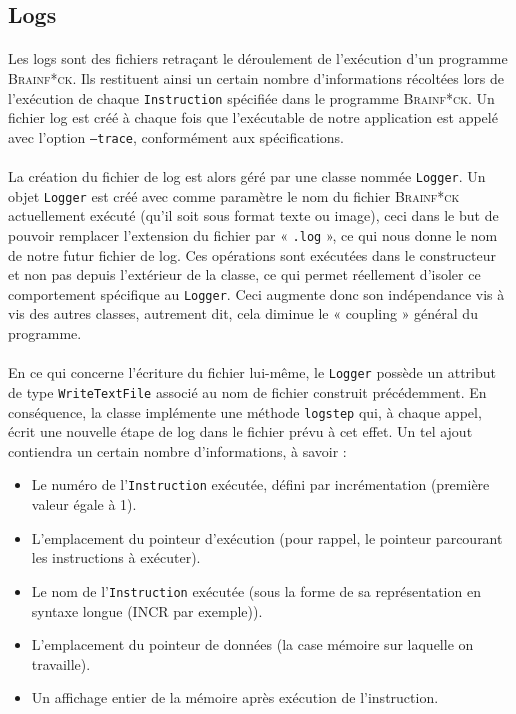 \documentclass[a4paper]{article}
\begin{document}
\subsection{Logs}
\paragraph{}Les logs sont des fichiers retraçant le déroulement de l'exécution d'un programme \textsc{Brainf*ck}. Ils restituent ainsi un certain nombre d'informations récoltées lors de l'exécution de chaque \texttt{Instruction} spécifiée dans le programme \textsc{Brainf*ck}. Un fichier log est créé à chaque fois que l'exécutable de notre application est appelé avec l'option \texttt{--trace}, conformément aux spécifications.

\paragraph{}La création du fichier de log est alors géré par une classe nommée \texttt{Logger}. Un objet \texttt{Logger} est créé avec comme paramètre le nom du fichier \textsc{Brainf*ck} actuellement exécuté (qu'il soit sous format texte ou image), ceci dans le but de pouvoir remplacer l'extension du fichier par « \texttt{.log} », ce qui nous donne le nom de notre futur fichier de log. Ces opérations sont exécutées dans le constructeur et non pas depuis l'extérieur de la classe, ce qui permet réellement d'isoler ce comportement spécifique au \texttt{Logger}. Ceci augmente donc son indépendance vis à vis des autres classes, autrement dit, cela diminue le « coupling » général du programme.

\paragraph{}En ce qui concerne l'écriture du fichier lui-même, le \texttt{Logger} possède un attribut de type \texttt{WriteTextFile} associé au nom de fichier construit précédemment. En conséquence, la classe implémente une méthode \texttt{logstep} qui, à chaque appel, écrit une nouvelle étape de log dans le fichier prévu à cet effet. Un tel ajout contiendra un certain nombre d'informations, à savoir :
\begin{itemize}
	\item Le numéro de l'\texttt{Instruction} exécutée, défini par incrémentation (première valeur égale à 1).
	\item L'emplacement du pointeur d'exécution (pour rappel, le pointeur parcourant les instructions à exécuter).
	\item Le nom de l'\texttt{Instruction} exécutée (sous la forme de sa représentation en syntaxe longue (INCR par exemple)).
	\item L'emplacement du pointeur de données (la case mémoire sur laquelle on travaille).
	\item Un affichage entier de la mémoire après exécution de l'instruction.
\end{itemize}
\end{document}
